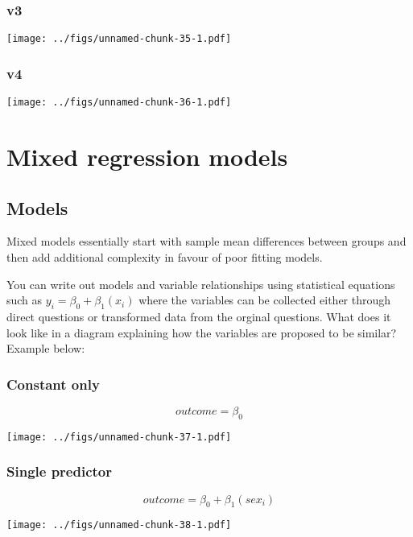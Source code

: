 \documentclass[]{book}
\begin{document}
\hypertarget{v3-1}{%
\subsection{v3}\label{v3-1}}

\texttt{[image: ../figs/unnamed-chunk-35-1.pdf]}

\hypertarget{v4-1}{%
\subsection{v4}\label{v4-1}}

\texttt{[image: ../figs/unnamed-chunk-36-1.pdf]}

\hypertarget{mixed}{%
\chapter{Mixed regression models}\label{mixed}}

\hypertarget{models}{%
\section{Models}\label{models}}

Mixed models essentially start with sample mean differences between groups and then add additional complexity in favour of poor fitting models.

You can write out models and variable relationships using statistical equations such as \(y_i = \beta_0 + \beta_1(x_i)\) where the variables can be collected either through direct questions or transformed data from the orginal questions. What does it look like in a diagram explaining how the variables are proposed to be similar? Example below:

\hypertarget{constant-only}{%
\subsection{Constant only}\label{constant-only}}

\[ outcome = \beta_0\]

\texttt{[image: ../figs/unnamed-chunk-37-1.pdf]}

\hypertarget{single-predictor}{%
\subsection{Single predictor}\label{single-predictor}}

\[ outcome = \beta_0 + \beta_1(sex_i)\]

\texttt{[image: ../figs/unnamed-chunk-38-1.pdf]}
\end{document}
